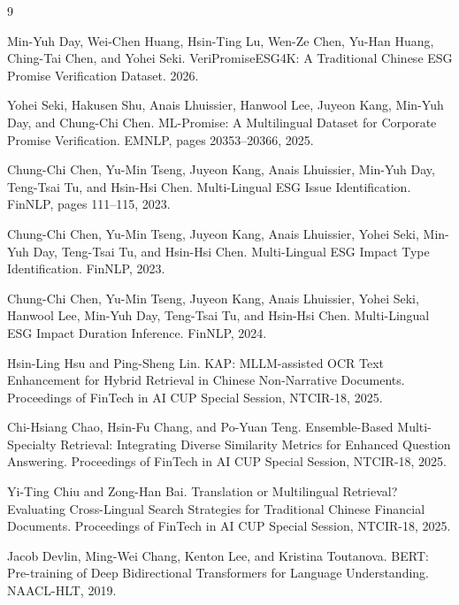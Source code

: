 \documentclass[11pt,a4paper]{ctexart}
\begin{document}

\begin{thebibliography}{9}
\small

Min-Yuh Day, Wei-Chen Huang, Hsin-Ting Lu, Wen-Ze Chen, Yu-Han Huang,
Ching-Tai Chen, and Yohei Seki. VeriPromiseESG4K: A Traditional Chinese ESG
Promise Verification Dataset. 2026.

Yohei Seki, Hakusen Shu, Anais Lhuissier, Hanwool Lee, Juyeon Kang,
Min-Yuh Day, and Chung-Chi Chen. ML-Promise: A Multilingual Dataset for
Corporate Promise Verification. EMNLP, pages 20353--20366, 2025.

Chung-Chi Chen, Yu-Min Tseng, Juyeon Kang, Anais Lhuissier, Min-Yuh Day,
Teng-Tsai Tu, and Hsin-Hsi Chen. Multi-Lingual ESG Issue Identification.
FinNLP, pages 111--115, 2023.

Chung-Chi Chen, Yu-Min Tseng, Juyeon Kang, Anais Lhuissier, Yohei Seki,
Min-Yuh Day, Teng-Tsai Tu, and Hsin-Hsi Chen. Multi-Lingual ESG Impact Type
Identification. FinNLP, 2023.

Chung-Chi Chen, Yu-Min Tseng, Juyeon Kang, Anais Lhuissier, Yohei Seki,
Hanwool Lee, Min-Yuh Day, Teng-Tsai Tu, and Hsin-Hsi Chen. Multi-Lingual ESG
Impact Duration Inference. FinNLP, 2024.

Hsin-Ling Hsu and Ping-Sheng Lin. KAP: MLLM-assisted OCR Text Enhancement for
Hybrid Retrieval in Chinese Non-Narrative Documents. Proceedings of FinTech in
AI CUP Special Session, NTCIR-18, 2025.

Chi-Hsiang Chao, Hsin-Fu Chang, and Po-Yuan Teng. Ensemble-Based
Multi-Specialty Retrieval: Integrating Diverse Similarity Metrics for Enhanced
Question Answering. Proceedings of FinTech in AI CUP Special Session,
NTCIR-18, 2025.

Yi-Ting Chiu and Zong-Han Bai. Translation or Multilingual Retrieval?
Evaluating Cross-Lingual Search Strategies for Traditional Chinese Financial
Documents. Proceedings of FinTech in AI CUP Special Session, NTCIR-18, 2025.

Jacob Devlin, Ming-Wei Chang, Kenton Lee, and Kristina Toutanova. BERT:
Pre-training of Deep Bidirectional Transformers for Language Understanding.
NAACL-HLT, 2019.

\end{thebibliography}
\end{document}
